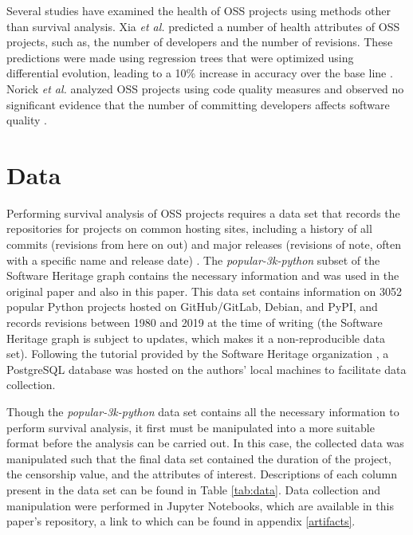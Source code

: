 \documentclass[acmconf]{acmart}
\begin{document}
Several studies have examined the health of OSS projects using methods other than survival analysis. 
Xia \emph{et al.} predicted a number of health attributes of OSS projects, such as, the number of developers and the number of revisions. 
These predictions were made using regression trees that were optimized using differential evolution, leading to a 10\% increase in accuracy over the base line \cite{xia2020predicting}. 
Norick \emph{et al.} analyzed OSS projects using code quality measures and observed no significant evidence that the number of committing developers affects software quality \cite{norick2010effects}. 

\section{Data} \label{data}

Performing survival analysis of OSS projects requires a data set that records the repositories for projects on common hosting sites, including a history of all commits (revisions from here on out) and major releases (revisions of note, often with a specific name and release date) \cite{ali2020cheating}. 
The \emph{popular-3k-python} subset of the Software Heritage graph \cite{pietri2019software} contains the necessary information and was used in the original paper and also in this paper.
This data set contains information on 3052 popular Python projects hosted on GitHub/GitLab, Debian, and PyPI, and records revisions between 1980 and 2019 at the time of writing (the Software Heritage graph is subject to updates, which makes it a non-reproducible data set).
Following the tutorial provided by the Software Heritage organization \cite{SQLdataset}, a PostgreSQL database was hosted on the authors' local machines to facilitate data collection.

Though the \emph{popular-3k-python} data set contains all the necessary information to perform survival analysis, it first must be manipulated into a more suitable format before the analysis can be carried out. 
In this case, the collected data was manipulated such that the final data set contained the duration of the project, the censorship value, and the attributes of interest. 
Descriptions of each column present in the data set can be found in Table \ref{tab:data}. 
Data collection and manipulation were performed in Jupyter Notebooks, which are available in this paper's repository, a link to which can be found in appendix \ref{artifacts}. 
\end{document}
